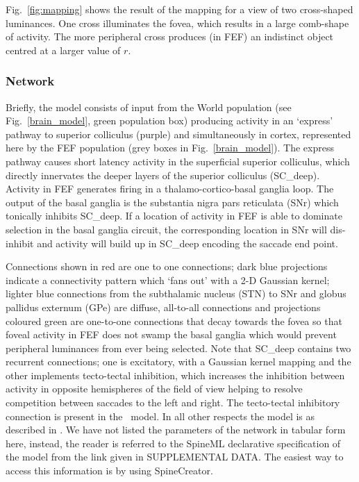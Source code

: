\documentclass{frontiersSCNS}
\begin{document}
Fig.~\ref{fig:mapping} shows the result of the mapping for a view of
two cross-shaped luminances. One cross illuminates the fovea, which
results in a large comb-shape of activity. The more peripheral cross
produces (in FEF) an indistinct object centred at a larger value of
$r$.

\subsubsection{Network}

Briefly, the model consists of input from the World population (see
Fig.~\ref{brain_model}, green population box) producing activity
in an `express' pathway to superior colliculus (purple) and
simultaneously in cortex, represented here by the FEF population (grey
boxes in Fig.~\ref{brain_model}). The express pathway causes short
latency activity in the superficial superior colliculus, which
directly innervates the deeper layers of the superior colliculus
(SC\_deep). Activity in FEF generates firing in a
thalamo-cortico-basal ganglia loop. The output of the basal ganglia is
the substantia nigra pars reticulata (SNr) which tonically inhibits
SC\_deep. If a location of activity in FEF is able to dominate
selection in the basal ganglia circuit, the corresponding location in
SNr will dis-inhibit and activity will build up in SC\_deep encoding
the saccade end point.

Connections shown in red are one to one connections; dark blue
projections indicate a connectivity pattern which `fans out' with a
2-D Gaussian kernel; lighter blue connections from the subthalamic
nucleus (STN) to SNr and globus pallidus externum (GPe)
are diffuse, all-to-all connections and projections coloured green are
one-to-one connections that decay towards the fovea so that foveal
activity in FEF does not swamp the basal ganglia which would prevent
peripheral luminances from ever being selected.
%
Note that SC\_deep contains two recurrent connections; one is
excitatory, with a Gaussian kernel mapping and the other implements
tecto-tectal inhibition, which increases the inhibition between
activity in opposite hemispheres of the field of view \citep{gian_g._mascetti_tectotectal_1981,olivier_evidence_2000} helping
to resolve competition between saccades to the left and right. The
tecto-tectal inhibitory connection is  present in
the \ccg~model. In all other respects the model is as described in
\cite{cope_basal_2017}.
%
We have not listed the parameters of the network in tabular form here,
instead, the reader is referred to the SpineML declarative
specification of the model from the link given in SUPPLEMENTAL DATA.
The easiest way to access this information is by using SpineCreator.
\end{document}
